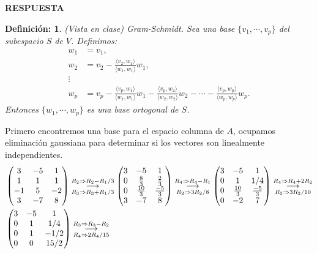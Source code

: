 \documentclass[11pt,letterpaper]{article}
\newcommand{\res}{\textbf{RESPUESTA}\\}
\newcommand{\grstep}[2][\relax]{%
   \ensuremath{\mathrel{
       {\mathop{\longrightarrow}\limits^{#2\mathstrut}_{
                                     \begin{subarray}{l} #1 \end{subarray}}}}}}
\newtheorem{thmd}{Definición:}
\begin{document}
\begin{itemize}
\res \begin{framed}
    \begin{thmd} \label{d_gram_schmidt}
	(Vista en clase) Gram-Schmidt. Sea una base $\{v_1,\cdots, v_p\}$ del subespacio $S$ de $V$. Definimos:
	\begin{align*}
	w_1 &= v_1,\\
	w_2 &= v_2-\frac{\langle v_2, w_1 \rangle}{\langle w_1,w_1 \rangle}w_1, \\
	\vdots\\
	w_p &= v_p-\frac{\langle v_p, w_1 \rangle}{\langle w_1,w_1 \rangle}w_1-\frac{\langle v_p, w_2 \rangle}{\langle w_2,w_2 \rangle}w_2-\cdots-\frac{\langle v_p, w_p \rangle}{\langle w_p,w_p \rangle}w_p.
	\end{align*}
	Entonces $\{w_1, \cdots, w_p\}$ es una base ortogonal de $S$. 
    \end{thmd}
\end{framed}
Primero encontremos una base para el espacio columna de $A$, ocupamos eliminación gaussiana para determinar si los vectores son linealmente independientes. 
\begin{align*}
&\begin{pmatrix}
3 & -5 &1\\
1 & 1 & 1\\
-1 & 5 &-2\\
3 & -7 & 8
\end{pmatrix}%
\grstep[R_3\Rightarrow R_3+R_1/3]{R_2 \Rightarrow R_2-R_1/3}
%
\begin{pmatrix}
3 & -5 & 1 \\
0 & \frac{8}{3} & \frac{2}{3} \\
0 & \frac{10}{3} & \frac{-5}{3} \\
3 & -7 & 8
\end{pmatrix}%
\grstep[R_2\Rightarrow 3R_2/8]{R_4 \Rightarrow R_4-R_1}
%
\begin{pmatrix}
3 & -5 & 1 \\
0 & 1 & 1/4 \\
0 & \frac{10}{3} & \frac{-5}{3} \\
0 & -2 & 7
\end{pmatrix}%
\grstep[R_3\Rightarrow 3R_3/10]{R_4 \Rightarrow R_4+2R_2}\\
&\begin{pmatrix}
3 & -5 & 1 \\
0 & 1 & 1/4 \\
0 & 1 & -1/2 \\
0 & 0 & 15/2
\end{pmatrix}%
\grstep[R_4\Rightarrow 2R_4/15]{R_3 \Rightarrow R_3-R_2}

\end{align*}
\end{itemize}
\end{document}
